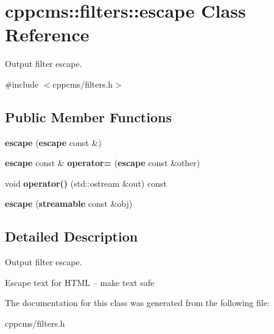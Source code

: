 \section{cppcms\+:\+:filters\+:\+:escape Class Reference}
\label{classcppcms_1_1filters_1_1escape}


Output filter escape.  




{\ttfamily \#include $<$cppcms/filters.\+h$>$}

\subsection*{Public Member Functions}
\begin{DoxyCompactItemize}
\item 
{\bfseries escape} ({\bf escape} const \&)\label{classcppcms_1_1filters_1_1escape_ae128f6c05b231a7424fc2323c39c8a82}

\item 
{\bf escape} const \& {\bfseries operator=} ({\bf escape} const \&other)\label{classcppcms_1_1filters_1_1escape_abcb45f1775b294e902895e04400a33a1}

\item 
void {\bfseries operator()} (std\+::ostream \&out) const \label{classcppcms_1_1filters_1_1escape_ad3dc5ca2d4592d2aada15b8e69604ad1}

\item 
{\bfseries escape} ({\bf streamable} const \&obj)\label{classcppcms_1_1filters_1_1escape_a4995eb58124be3c31c09a3fcfa3599da}

\end{DoxyCompactItemize}


\subsection{Detailed Description}
Output filter escape. 

Escape text for H\+T\+ML -- make text safe 

The documentation for this class was generated from the following file\+:\begin{DoxyCompactItemize}
\item 
cppcms/filters.\+h\end{DoxyCompactItemize}
